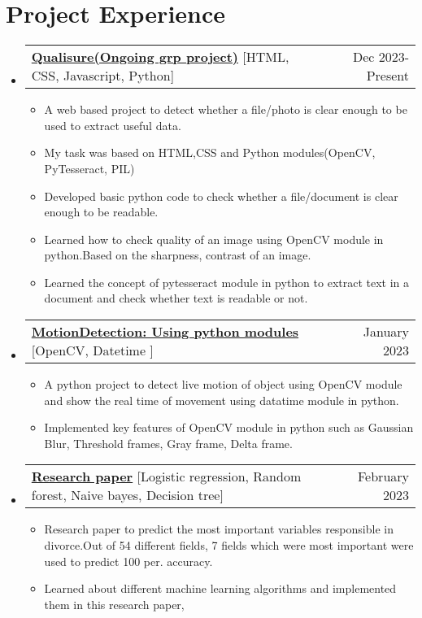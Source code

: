 \documentclass[letterpaper,11pt]{article}
\makeatletter
\newcommand{\resumeItem}[1]{
  \item\small{
    {#1 \vspace{-2pt}}
  }
}
\newcommand{\resumeProjectHeading}[2]{
    \item
    \begin{tabular*}{0.97\textwidth}{l@{\extracolsep{\fill}}r}
      \small#1 & #2 \\
    \end{tabular*}\vspace{-7pt}
}
\newcommand{\resumeSubHeadingListStart}{\begin{itemize}[leftmargin=0.15in, label={}]}
\newcommand{\resumeSubHeadingListEnd}{\end{itemize}}
\newcommand{\resumeItemListStart}{\begin{itemize}}
\newcommand{\resumeItemListEnd}{\end{itemize}\vspace{-5pt}}
\makeatother
\begin{document}




\section{Project Experience}

    \resumeSubHeadingListStart
        \resumeProjectHeading
        {\textbf{\href{https://github.com/akj-07/Qualisure.git}{\textbf{Qualisure(Ongoing grp project)}}}{ [HTML, CSS, Javascript, Python]}}{Dec 2023- Present}
            \resumeItemListStart
                \resumeItem{A web based project to detect whether a file/photo is clear enough to be used to extract useful data.}
                \resumeItem{My task was based on HTML,CSS and Python modules(OpenCV, PyTesseract, PIL)}
                \resumeItem{Developed basic python code to check whether a file/document is clear enough to be readable.}
                \resumeItem{Learned how to check quality of an image using  OpenCV module in python.Based on the sharpness, contrast of an image.}
                \resumeItem{Learned the concept of pytesseract module in python to extract text in a document and check whether text is readable or not.}
        \resumeItemListEnd
    \resumeSubHeadingListEnd

    \resumeSubHeadingListStart
        \resumeProjectHeading
        {\textbf{\href{https://github.com/akj-07/Motion_Detection.git}{\textbf{MotionDetection: Using python modules}}}{ [OpenCV, Datetime ]}}{January 2023}
            \resumeItemListStart
                \resumeItem{A python project to detect live motion of object using OpenCV module and show the real time of movement using datatime module in python.}
                \resumeItem{Implemented key features of OpenCV module in python such as Gaussian Blur, Threshold frames, Gray frame, Delta frame.}
            \resumeItemListEnd
    \resumeSubHeadingListEnd

 \resumeSubHeadingListStart
        \resumeProjectHeading
        {\textbf{\href{ https://doi.org/10.46647/ijetms.2023.v07i02.024}{\textbf{Research paper}}}{ [Logistic regression, Random forest, Naive bayes, Decision tree]}}{February 2023}
            \resumeItemListStart
                \resumeItem{Research paper to predict the most important variables responsible in divorce.Out of 54 different fields, 7 fields which were most important were used to predict 100 per. accuracy. }
                \resumeItem{Learned about different machine learning algorithms and implemented them in this research paper,}
            \resumeItemListEnd
    \resumeSubHeadingListEnd
\end{document}
